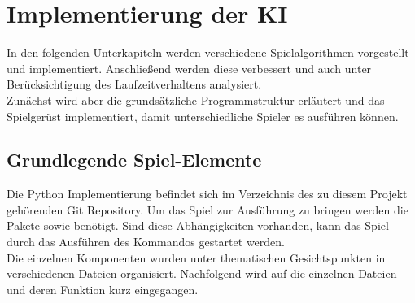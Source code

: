 \chapter{Implementierung der KI}
\label{implementation}
In den folgenden Unterkapiteln  werden verschiedene Spielalgorithmen vorgestellt und implementiert. Anschließend werden diese verbessert und auch unter Berücksichtigung des Laufzeitverhaltens analysiert.
\\Zunächst wird aber die grundsätzliche Programmstruktur erläutert und das Spielgerüst implementiert, damit unterschiedliche Spieler es ausführen können.
\section{Grundlegende Spiel-Elemente}
Die Python Implementierung befindet sich im Verzeichnis  des zu diesem Projekt gehörenden Git Repository. Um das Spiel zur Ausführung zu bringen werden die Pakete  sowie  benötigt. Sind diese Abhängigkeiten vorhanden, kann das Spiel durch das Ausführen des Kommandos  gestartet werden.
\\Die einzelnen Komponenten wurden unter thematischen Gesichtspunkten in verschiedenen Dateien organisiert. Nachfolgend wird auf die einzelnen Dateien und deren Funktion kurz eingegangen.
